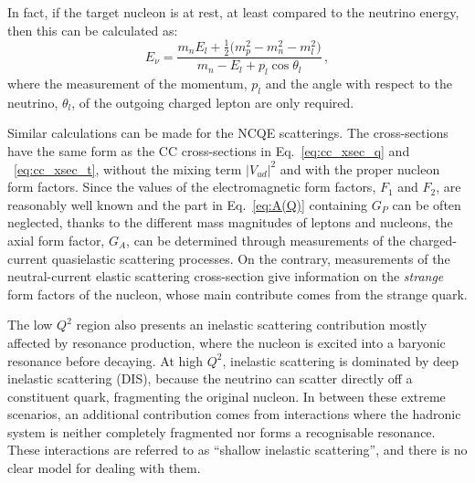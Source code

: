 In fact, if the target nucleon is at rest, at least compared to the neutrino energy, %
then this can be calculated as:
\begin{equation}
	E_\nu = \frac{m_n E_l + \frac{1}{2}\big ( m_p^2-m_n^2-m_l^2)}{m_n - E_l+p_l \cos \theta_l}\,,
\end{equation}
where the measurement of the momentum, $p_l$ and the angle with respect to the neutrino, $\theta_l$, of the %
outgoing charged lepton are only required.

Similar calculations can be made for the NCQE scatterings.
The cross-sections have the same form as the CC cross-sections in Eq.~\ref{eq:cc_xsec_q} and ~\ref{eq:cc_xsec_t}, %
without the mixing term $|V_{ud}|^2$ and with the proper nucleon form factors.
Since the values of the electromagnetic form factors, $F_1$ and $F_2$, are reasonably well known and the part %
in Eq.~\ref{eq:A(Q)} containing $G_P$ can be often neglected, thanks to the different mass magnitudes of %
leptons and nucleons, the axial form factor, $G_A$, can be determined through measurements of the charged-current %
quasielastic scattering processes.
On the contrary, measurements of the neutral-current elastic scattering cross-section give information %
on the \emph{strange} form factors of the nucleon, whose main contribute comes from the strange quark.

The low $Q^2$ region also presents an inelastic scattering contribution mostly affected by resonance production, %
where the nucleon is excited into a baryonic resonance before decaying.
At high $Q^2$, inelastic scattering is dominated by deep inelastic scattering (DIS), because the neutrino can scatter %
directly off a constituent quark, fragmenting the original nucleon.
In between these extreme scenarios, an additional contribution comes from interactions where the hadronic %
system is neither completely fragmented nor forms a recognisable resonance.
These interactions are referred to as ``shallow inelastic scattering'', and there is no clear model for dealing %
with them.

